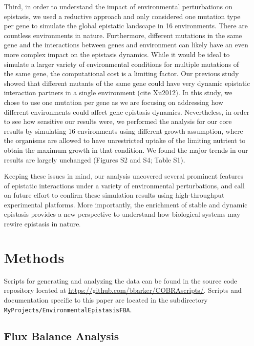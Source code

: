 Third, in order to understand the impact of environmental
perturbations on epistasis, we used a reductive approach and only
considered one mutation type per gene to simulate the global epistatic
landscape in 16 environments. There are countless environments in
nature. Furthermore, different mutations in the same gene and the
interactions between genes and environment can likely have an even
more complex impact on the epistasis dynamics. While it would be ideal
to simulate a larger variety of environmental conditions for multiple
mutations of the same gene, the computational cost is a limiting
factor. Our previous study showed that different mutants of the same
gene could have very dynamic epistatic interaction partners in a
single environment (cite Xu2012). In this study, we chose to use one
mutation per gene as we are focusing on addressing how different
environments could affect gene epistasis dynamics. Nevertheless, in
order to see how sensitive our results were, we performed the analysis
for our core results by simulating 16 environments using different
growth assumption, where the organisms are allowed to have
unrestricted uptake of the limiting nutrient to obtain the maximum
growth in that condition. We found the major trends in our results are
largely unchanged (Figures S2 and S4; Table S1).

Keeping these issues in mind, our analysis uncovered several prominent
features of epistatic interactions under a variety of environmental
perturbations, and call on future effort to confirm these simulation
results using high-throughput experimental platforms. More
importantly, the enrichment of stable and dynamic epistasis provides a
new perspective to understand how biological systems may rewire
epistasis in nature.

\section{Methods}

Scripts for generating and analyzing the data can be found in the
source code repository located at
\url{https://github.com/bbarker/COBRAscripts/}. Scripts and
documentation specific to this paper are located in the subdirectory
\texttt{MyProjects/EnvironmentalEpistasisFBA}.

\subsection{Flux Balance Analysis}

